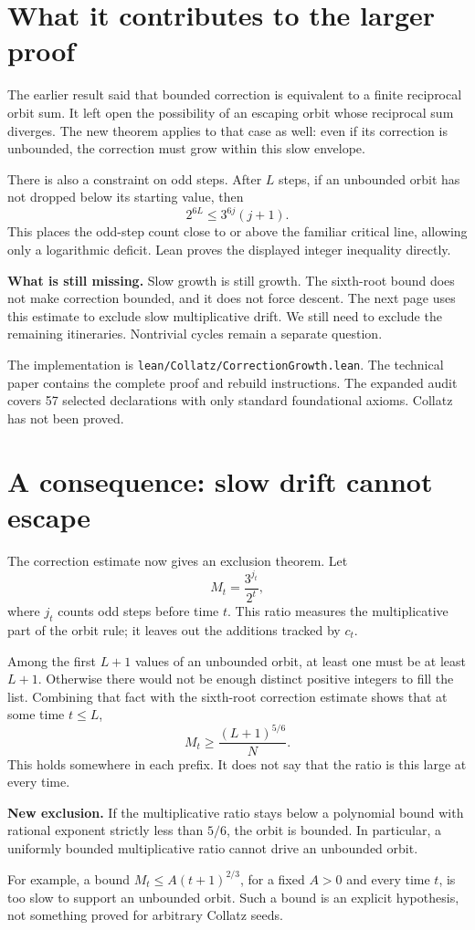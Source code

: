 \documentclass[11pt]{article}
\begin{document}
\section{What it contributes to the larger proof}
The earlier result said that bounded correction is equivalent to a finite reciprocal orbit sum. It left open the possibility of an escaping orbit whose reciprocal sum diverges. The new theorem applies to that case as well: even if its correction is unbounded, the correction must grow within this slow envelope.

There is also a constraint on odd steps. After $L$ steps, if an unbounded orbit has not dropped below its starting value, then
\[
2^{6L}\le3^{6j}(j+1).
\]
This places the odd-step count close to or above the familiar critical line, allowing only a logarithmic deficit. Lean proves the displayed integer inequality directly.
\begin{keyidea}
\textbf{What is still missing.} Slow growth is still growth. The sixth-root bound does not make correction bounded, and it does not force descent. The next page uses this estimate to exclude slow multiplicative drift. We still need to exclude the remaining itineraries. Nontrivial cycles remain a separate question.
\end{keyidea}
The implementation is \texttt{lean/Collatz/CorrectionGrowth.lean}. The technical paper contains the complete proof and rebuild instructions. The expanded audit covers 57 selected declarations with only standard foundational axioms. Collatz has not been proved.

\newpage
\section{A consequence: slow drift cannot escape}
The correction estimate now gives an exclusion theorem. Let
\[
M_t=\frac{3^{j_t}}{2^t},
\]
where $j_t$ counts odd steps before time $t$. This ratio measures the multiplicative part of the orbit rule; it leaves out the additions tracked by $c_t$.

Among the first $L+1$ values of an unbounded orbit, at least one must be at least $L+1$. Otherwise there would not be enough distinct positive integers to fill the list. Combining that fact with the sixth-root correction estimate shows that at some time $t\le L$,
\[
M_t\ge\frac{(L+1)^{5/6}}{N}.
\]
This holds somewhere in each prefix. It does not say that the ratio is this large at every time.
\begin{keyidea}
\textbf{New exclusion.} If the multiplicative ratio stays below a polynomial bound with rational exponent strictly less than $5/6$, the orbit is bounded. In particular, a uniformly bounded multiplicative ratio cannot drive an unbounded orbit.
\end{keyidea}
For example, a bound $M_t\le A(t+1)^{2/3}$, for a fixed $A>0$ and every time $t$, is too slow to support an unbounded orbit. Such a bound is an explicit hypothesis, not something proved for arbitrary Collatz seeds.
\end{document}
